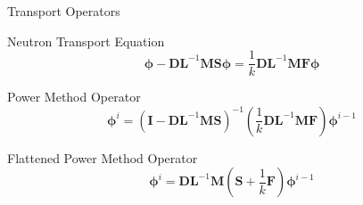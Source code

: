 \documentclass[fleqn]{beamer}
\newcommand{\mat}[1]{\ensuremath{\bm{#1}}}
\renewcommand{\vec}[1]{\ensuremath{\bm{#1}}}
\begin{document}
\begin{frame}{Transport Operators}
    \begin{block}{Neutron Transport Equation}
        \vspace*{-\baselineskip}\setlength\belowdisplayshortskip{0pt}
        \begin{equation*}
            \vec{\phi} - \mat{D}\mat{L}^{-1}\mat{M}\mat{S}\vec{\phi} = \frac{1}{k} \mat{D}\mat{L}^{-1}\mat{M}\mat{F} \vec{\phi}  
        \end{equation*}
    \end{block}
    \begin{block}{Power Method Operator}
        \vspace*{-\baselineskip}\setlength\belowdisplayshortskip{0pt}
        \begin{equation*}
            \vec{\phi}^{i} = \left(\mat{I} - \mat{D}\mat{L}^{-1}\mat{M}\mat{S}\right)^{-1} \left(\frac{1}{k} \mat{D}\mat{L}^{-1}\mat{M}\mat{F}\right) \vec{\phi}^{i-1} 
        \end{equation*}
    \end{block}
    \begin{block}{Flattened Power Method Operator\footnotemark}
        \vspace*{-\baselineskip}\setlength\belowdisplayshortskip{0pt}
        \begin{equation*}
            \vec{\phi}^{i} =  \mat{D}\mat{L}^{-1}\mat{M} \left(\mat{S} + \frac{1}{k} \mat{F}\right)\vec{\phi}^{i-1}   
        \end{equation*}
    \end{block}
\end{frame}  
\end{document}

